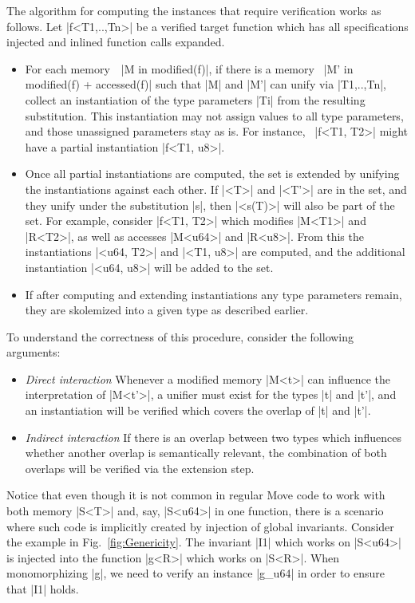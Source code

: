 The algorithm for computing the instances that require verification works as
follows. Let |f<T1,..,Tn>| be a verified target function which has all
specifications injected and inlined function calls expanded.
\begin{itemize}
\item For each memory~~|M in modified(f)|, if there is a memory~%
  |M' in modified(f) + accessed(f)| such that |M| and |M'| can unify via
  |T1,..,Tn|, collect an instantiation of the type parameters |Ti| from the
  resulting substitution. This instantiation may not assign values to all type
  parameters, and those unassigned parameters stay as is. For instance,~%
  |f<T1, T2>| might have a partial instantiation |f<T1, u8>|.
\item Once all partial instantiations are computed, the set is
  extended by unifying the instantiations against each other. If |<T>| and
  |<T'>| are in the set, and they unify under the substitution |s|, then
  |<s(T)>| will also be part of the set.  For example, consider |f<T1, T2>|
  which modifies |M<T1>| and |R<T2>|, as well as accesses |M<u64>| and
  |R<u8>|. From this the instantiations |<u64, T2>| and |<T1, u8>| are computed,
  and the additional instantiation |<u64, u8>| will be added to the set.
\item If after computing and extending instantiations any type parameters
  remain, they are skolemized into a given type as described earlier.
\end{itemize}

\noindent To understand the correctness of this procedure, consider the
following arguments:

\begin{itemize}
\item \emph{Direct interaction} Whenever a modified memory |M<t>| can influence
  the interpretation of |M<t'>|, a unifier must exist for the types |t| and |t'|,
  and an instantiation will be verified which covers the overlap of |t| and
  |t'|.
\item \emph{Indirect interaction} If there is an overlap between two types
  which influences whether another overlap is semantically relevant, the
  combination of both overlaps will be verified via the extension step.
\end{itemize}

Notice that even though it is not common in regular Move code to work with both
memory |S<T>| and, say, |S<u64>| in one function, there is a scenario where such
code is implicitly created by injection of global invariants. Consider the
example in Fig.~\ref{fig:Genericity}. The invariant |I1| which works on |S<u64>|
is injected into the function |g<R>| which works on |S<R>|. When monomorphizing
|g|, we need to verify an instance |g_u64| in order to ensure that |I1| holds.



